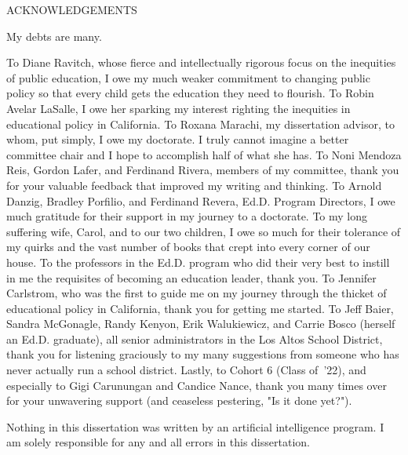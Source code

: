 
\begin{center}
  ACKNOWLEDGEMENTS
\end{center}

\indent%
My debts are many.
  
To Diane Ravitch, whose fierce and intellectually rigorous focus on the inequities of public education, I owe my much weaker commitment to changing public policy so that every child gets the education they need to flourish. To Robin Avelar LaSalle, I owe her sparking my interest righting the inequities in educational policy in California. To Roxana Marachi, my dissertation advisor, to whom, put simply, I owe my doctorate. I truly cannot imagine a better committee chair and I hope to accomplish half of what she has. To Noni Mendoza Reis, Gordon Lafer, and Ferdinand Rivera, members of my committee, thank you for your valuable feedback that improved my writing and thinking. To Arnold Danzig, Bradley Porfilio, and Ferdinand Revera, Ed.D. Program Directors, I owe much gratitude for their support in my journey to a doctorate. To my long suffering wife, Carol, and to our two children, I owe so much for their tolerance of my quirks and the vast number of books that crept into every corner of our house. To the professors in the Ed.D. program who did their very best to instill in me the requisites of becoming an education leader, thank you. To Jennifer Carlstrom, who was the first to guide me on my journey through the thicket of educational policy in California, thank you for getting me started. To Jeff Baier, Sandra McGonagle, Randy Kenyon, Erik Walukiewicz, and Carrie Bosco (herself an Ed.D. graduate), all senior administrators in the Los Altos School District, thank you for listening graciously to my many suggestions from someone who has never actually run a school district. Lastly, to Cohort 6 (Class of '22), and especially to Gigi Carunungan and Candice Nance, thank you many times over for your unwavering support (and ceaseless pestering, "Is it done yet?").

Nothing in this dissertation was written by an artificial intelligence program. I am solely responsible for any and all errors in this dissertation.

